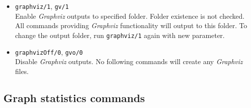 \documentclass[11pt, a4paper,draft]{article}
\newcommand{\pl}[1]{\texttt{#1}} %
\theoremstyle{plain}
\theoremstyle{definition}
\theoremstyle{remark}
\newcommand{\gv}{\textit{Graphviz}}
\begin{document}
\begin{itemize}
\item \pl{graphviz/1}, \pl{gv/1} \\
Enable \gv{} outputs to specified folder. 
Folder existence is not checked. 
All commands providing \gv{} functionality will output to this folder. 
To change the output folder, run \pl{graphviz/1} again with new parameter.

\item \pl{graphvizOff/0}, \pl{gvo/0} \\
Disable \gv{} outputs. No following commands will create any \gv{} files.
\end{itemize}

\subsection{Graph statistics commands}
\end{document}
